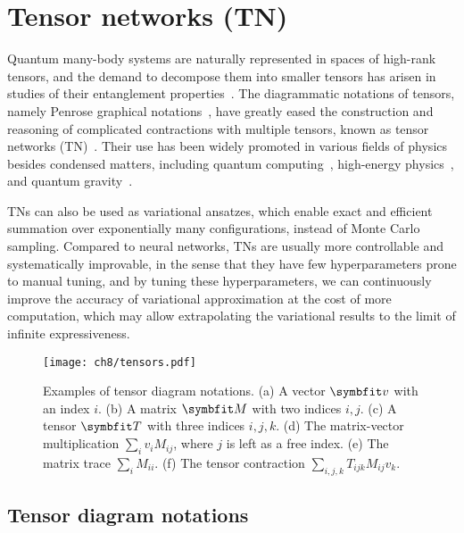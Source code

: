 \chapter{Tensor networks (TN)}
\label{ch:tn}

Quantum many-body systems are naturally represented in spaces of high-rank tensors, and the demand to decompose them into smaller tensors has arisen in studies of their entanglement properties~\cite{white1992density}. The diagrammatic notations of tensors, namely Penrose graphical notations~\cite{penrose1971applications}, have greatly eased the construction and reasoning of complicated contractions with multiple tensors, known as tensor networks (TN)~\cite{bridgeman2017hand, orus2014practical}. Their use has been widely promoted in various fields of physics besides condensed matters, including quantum computing~\cite{feynman1986quantum, nielsen2010quantum}, high-energy physics~\cite{banuls2018tensor, banuls2020review}, and quantum gravity~\cite{perez2013spin, you2016entanglement, hayden2016holographic, asaduzzaman2020tensor}.

TNs can also be used as variational ansatzes, which enable exact and efficient summation over exponentially many configurations, instead of Monte Carlo sampling. Compared to neural networks, TNs are usually more controllable and systematically improvable, in the sense that they have few hyperparameters prone to manual tuning, and by tuning these hyperparameters, we can continuously improve the accuracy of variational approximation at the cost of more computation, which may allow extrapolating the variational results to the limit of infinite expressiveness.

\begin{figure}[htb]
\centering
\texttt{[image: ch8/tensors.pdf]}
\caption[Tensor diagram notations]{
Examples of tensor diagram notations.
(a) A vector $\vv$ with an index $i$.
(b) A matrix $\mM$ with two indices $i, j$.
(c) A tensor $\mT$ with three indices $i, j, k$.
(d) The matrix-vector multiplication $\sum_i v_i M_{i j}$, where $j$ is left as a free index.
(e) The matrix trace $\sum_i M_{i i}$.
(f) The tensor contraction $\sum_{i, j, k} T_{i j k} M_{i j} v_k$.
}
\label{fig:tensors}
\end{figure}

\section{Tensor diagram notations}

